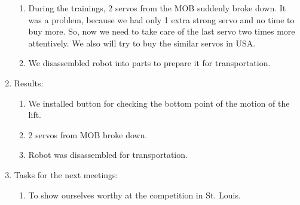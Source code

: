 \begin{enumerate}
\begin{enumerate}
		\item During the trainings, 2 servos from the MOB suddenly broke down. It was a problem, because we had only 1 extra strong servo and no time to buy more. So, now we need to take care of the last servo two times more attentively. We also will try to buy the similar servos in USA.
		
        \item We disassembled robot into parts to prepare it for transportation.

	\end{enumerate}
	
	\item Results:
	\begin{enumerate}
		
		\item We installed button for checking the bottom point of the motion of the lift.
		
		\item 2 servos from MOB broke down.
		
        \item Robot was disassembled for transportation.
		
	\end{enumerate}
	
	\item Tasks for the next meetings:
	\begin{enumerate}
		
		\item To show ourselves worthy at the competition in St. Louis.
			
	\end{enumerate}
\end{enumerate}
\fillpage
